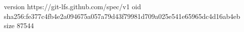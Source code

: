 version https://git-lfs.github.com/spec/v1
oid sha256:fe377c4fb4e2a094675a057a79d43f79981d709a025e541e65965dc4d16ab4eb
size 87544

